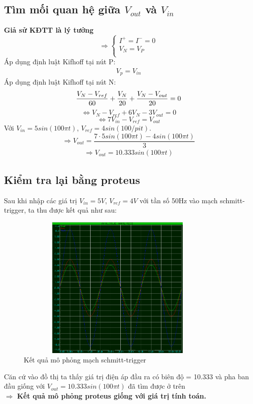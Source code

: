 \subsection{Tìm mối quan hệ giữa $V_{out}$ và $V_{in}$}
\hspace*{0.6cm}\textbf{Giả sử KĐTT là lý tưởng}
				\[
				\Rightarrow
				\begin{cases}
					I^+ = I^- = 0\\
					V_N = V_P\\
				\end{cases}
				\]
Áp dụng định luật Kifhoff tại nút P:
\begin{align}
    V_p = V_{in}
\end{align}
Áp dụng định luật Kifhoff tại nút N:
\[
    \frac{V_N-V_{ref}}{60} + \frac{V_N}{20} + \frac{V_N-V_{out}}{20} = 0 \\ 
\]
\[
    \Longleftrightarrow V_N - V_{ref} + 6V_N - 3V_{out} = 0 
\]
\[
    \Longleftrightarrow 7V_{in} - V_{ref} = V_{out}
\]
Với $V_{in} = 5sin(100\pi t)$, $V_{ref} = 4sin(100/pi t)$.
\[
    \Rightarrow V_{out} = \frac{7 \cdot 5sin(100\pi t) - 4sin(100\pi t)}{3}
\]
\begin{align}
    \Rightarrow V_{out} = 10.333sin(100\pi t)
\end{align}
\cleardoublepage
\subsection{Kiểm tra lại bằng proteus}
\hspace*{0.6cm}Sau khi nhập các giá trị $V_{in} = 5V$, $V_{ref} = 4V$ với tần số 50Hz vào mạch schmitt-trigger, ta thu được kết quả như sau:
\begin{figure}[H]
    \centering
    \includegraphics[width=100mm, height = 70mm]{pictures/result3_b.png}
    \caption{Kết quả mô phỏng mạch schmitt-trigger}
\end{figure}
Căn cứ vào đồ thị ta thấy giá trị điện áp đầu ra có biên độ = 10.333 và pha ban đầu giống với $V_{out} = 10.333sin(100\pi  t)$ đã tìm được ở trên\\
\hspace*{0.6cm}$\Rightarrow$ \textbf{Kết quả mô phỏng proteus giống với giá trị tính toán.}